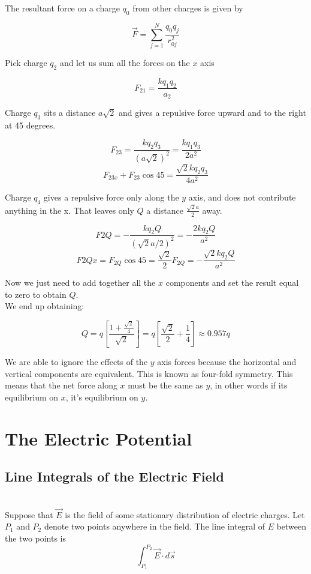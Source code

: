 \documentclass[svgnames]{article}
\begin{document}
The resultant force on a charge $q_0$ from other charges is given by 

\[
  \vec{F} = \sum_{j=1}^{N} \frac{q_0q_j}{r_{0j}^2} 
\]

Pick charge $q_2$ and let us sum all the forces on the $x$ axis

\[
F_{21} = \frac{kq_1q_2}{a_2}
\]

Charge $q_3$ sits a distance $a\sqrt{2}$ and gives a repulsive force upward
and to the right at 45 degrees. 

\[
  F_{23} = \frac{kq_2q_3}{(a\sqrt{2})^2} = \frac{kq_1q_3}{2a^2}
\] 
\[
  F_{23x} + F_{23} \cos 45 = \frac{\sqrt{2}kq_2q_3}{4a^2}
\] 

Charge $q_4$ gives a repulsive force only along the $y$ axis, and does not
contribute anything in the x. That leaves only $Q$ a distance
$\frac{\sqrt{2}a}{2}$ away. 

\[
  F{2Q} = -\frac{kq_2Q}{(\sqrt{2}a/2)^2} = -\frac{2kq_2Q}{a^2}
\] 
\[
  F{2Qx} = F_{2Q} \cos 45 = \frac{\sqrt{2}}{2}F_{2Q}
  = -\frac{\sqrt{2}kq_2Q}{a^2}
\] 

 

Now we just need to add together all the $x$ components and set the result
equal to zero to obtain $Q$. \\

We end up obtaining: 

\[
  Q = q\left[\frac{1+\frac{\sqrt{2}}{4}}{\sqrt{2}}\right]
  = q\left[\frac{\sqrt{2}}{2} + \frac{1}{4}\right] \approx 0.957q
\]

We are able to ignore the effects of the $y$ axis forces because the horizontal
and vertical components are equivalent. This is known as four-fold symmetry.
This means that the net force along $x$ must be the same as $y$, in other words
if its equilibrium on  $x$, it's equilibrium on  $y$. 



\newpage

\section{The Electric Potential} 

\subsection{Line Integrals of the Electric Field} \mbox{} \\

Suppose that $\vec{E}$ is the field of some stationary distribution of electric charges. Let $P_1$ and $P_2$ denote two points anywhere in the field. The line integral of $E$ between the two points is 
\[ \int_{P_1}^{P_2} \vec{E} \cdot d\vec{s} \] \\
\end{document}
